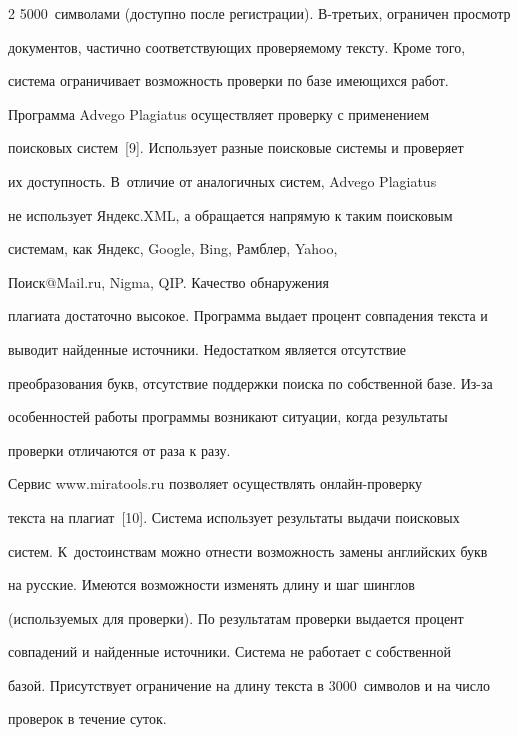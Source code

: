 \begin{multicols}{2}
5000~символами (доступно после регистрации). В-третьих, ограничен просмотр 

документов, частично соответствующих проверяемому тексту. Кроме того, 

сис\-те\-ма ограничивает возможность проверки по базе имеющихся работ.

  

  Программа {Advego Plagiatus} осуществляет проверку с применением 

поисковых сис\-тем~[9]. Использует разные поисковые сис\-те\-мы и проверяет 

их доступность. В~отличие от аналогичных сис\-тем, {Advego Plagiatus} 

не использует Яндекс.XML, а обращается напрямую к таким поисковым 

сис\-те\-мам, как Яндекс, {Google}, {Bing}, Рамблер, {Yahoo}, 

\mbox{Поиск@Mail.ru}, {Nigma}, {QIP}. Качество обнаружения 

плагиата достаточно высокое. Программа выдает процент совпадения текста и 

выводит найденные источники. Недостатком является отсутствие 

преобразования букв, отсутствие поддержки поиска по собственной базе. Из-за 

особенностей работы программы возникают ситуации, когда результаты 

проверки отличаются от раза к разу. 

  

  Сервис {\sf www.miratools.ru} позволяет осуществлять онлайн-проверку 

текста на плагиат~[10]. Сис\-те\-ма использует результаты выдачи поисковых 

сис\-тем. К~достоинствам можно отнести возможность замены английских букв 

на русские. Имеются возможности изменять длину и шаг шинглов 

(используемых для проверки). По результатам проверки выдается процент 

совпадений и найденные источники. Сис\-те\-ма не работает с собственной 

базой. Присутствует ограничение на длину текста в 3000~символов и на число 

проверок в течение суток. 



\begin{table}\small %


\end{table}
\end{multicols}
